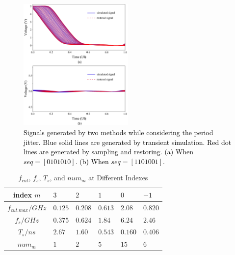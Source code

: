 \documentclass[conference]{IEEEtran}
\begin{document}
\begin{figure}[t]
\centerline{\includegraphics[width=160pt]{Fig11.png}}
\caption{\textcolor{black}{Signals generated by two methods while considering the period jitter. Blue solid lines are generated by transient simulation. Red dot lines are generated by sampling and restoring. (a) When $seq=[0101010]$. (b) When $seq=[1101001]$.}}
\label{Fig11}
\end{figure}

\begin{table}[tb]
\caption{$f_{cut}$, $f_s$, $T_s$, and $num_m$ at Different Indexes}
\label{TabIII}
    \begin{center}
    \begin{tabular}{|p{2.0cm}|p{0.8cm}|p{0.8cm}|p{0.8cm}|p{0.8cm}|p{0.8cm}|}\hline
        \multicolumn{1}{|c|}{\textbf{index $m$}}
            &$3$        &$2$        &$1$        &$0$        &$-1$\\\hline
        \multicolumn{1}{|c|}{\textbf{$f_{cut.max}/GHz$}}
            &$0.125$    &$0.208$    &$0.613$    &$2.08$     &$0.820$\\\hline
        \multicolumn{1}{|c|}{\textbf{$f_s/GHz$}}
            &$0.375$    &$0.624$    &$1.84$     &$6.24$     &$2.46$\\\hline
        \multicolumn{1}{|c|}{\textbf{$T_s/ns$}}
            &$2.67$     &$1.60$     &$0.543$    &$0.160$    &$0.406$\\\hline
        \multicolumn{1}{|c|}{\textbf{$num_m$}}
            &$1$        &$2$        &$5$        &$15$        &$6$\\\hline
    \end{tabular}
    \end{center}
\end{table}
\end{document}
